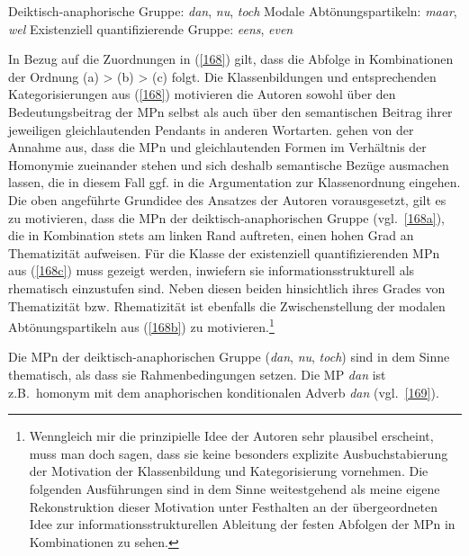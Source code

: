 \begin{exe}
	\ex\label{168} 
		\begin{xlist}	
			\ex\label{168a} Deiktisch-anaphorische Gruppe:  \textit{dan}, \textit{nu}, \textit{toch}
			\ex\label{168b} Modale Abtönungspartikeln:  \textit{maar}, \textit{wel}
			\ex\label{168c} Existenziell quantifizierende Gruppe:  \textit{eens}, \textit{even}
		\end{xlist}
\end{exe}
In Bezug auf die Zuordnungen in (\ref{168}) gilt, dass die Abfolge in Kombinationen der Ordnung (a) > (b) > (c) folgt. Die Klassenbildungen und entsprechenden Ka\-tegorisierungen aus (\ref{168}) motivieren die Autoren sowohl über den Bedeutungsbeitrag der MPn selbst als auch über den semantischen Beitrag ihrer jeweiligen gleichlautenden Pendants in anderen Wortarten. \citet{Vriendt1991} gehen von der Annahme aus, dass die MPn und gleichlautenden Formen im Verhältnis der Homonymie zueinander stehen und sich deshalb semantische Bezüge ausmachen lassen, die in diesem Fall ggf. in die Argumentation zur Klassenordnung eingehen. Die oben angeführte Grundidee des Ansatzes der Autoren vorausgesetzt, gilt es zu motivieren, dass die MPn der deiktisch-anaphorischen Gruppe (vgl.\ \ref{168a}), die in Kombination stets am linken Rand auftreten, einen hohen Grad an Thematizität  aufweisen. Für die Klasse der e\-xistenziell quantifizierenden MPn aus (\ref{168c}) muss gezeigt werden, inwiefern sie informationsstrukturell als rhematisch einzustufen sind. Neben diesen beiden   hinsichtlich ihres Grades von Thematizität bzw. Rhematizität  ist ebenfalls die Zwischenstellung der modalen Abtönungspartikeln aus (\ref{168b}) zu motivieren.\footnote{ Wenngleich mir die prinzipielle Idee der Autoren sehr plausibel erscheint, muss man doch sagen, dass sie keine besonders explizite Ausbuchstabierung der Motivation der Klassenbildung und Kategorisierung vornehmen. Die folgenden Ausführungen sind in dem Sinne weitestgehend als meine eigene Rekonstruktion dieser Motivation unter Festhalten an der übergeordneten Idee zur informationsstrukturellen Ableitung der festen Abfolgen der MPn in Kombinationen zu sehen.}

Die MPn der deiktisch-anaphorischen Gruppe (\textit{dan}, \textit{nu}, \textit{toch}) sind in dem Sinne thematisch, als dass sie Rahmenbedingungen setzen. Die MP \textit{dan} ist z.B.\ homonym  mit dem anaphorischen konditionalen Adverb \textit{dan} (vgl.\ \ref{169}).

